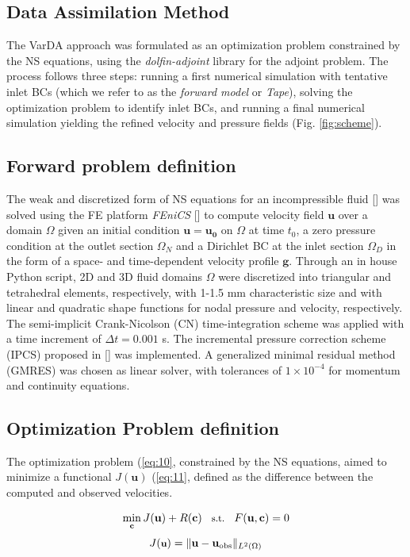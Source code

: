 \subsection*{Data Assimilation Method}
The VarDA approach was formulated as an optimization problem constrained by the NS equations, using the \emph{dolfin-adjoint} library for the adjoint problem. The process follows three steps: running a first numerical simulation with tentative inlet BCs (which we refer to as the \emph{forward model} or \emph{Tape}), solving the optimization problem to identify inlet BCs, and running a final numerical simulation yielding the refined velocity and pressure fields (Fig. \ref{fig:scheme}).

\subsection*{Forward problem definition}
The weak and discretized form of NS equations for an incompressible fluid [\cite{Stokes2009}] was solved using the FE platform \emph{FEniCS} [\cite{Alnaes2015}] to compute velocity field $\textbf{u}$ over a domain $\Omega$ given an initial condition \(\mathbf{u}=\mathbf{u_0}\) on $\Omega$ at time $t_0$, a zero pressure condition at the outlet section $\Omega_N$ and a Dirichlet BC at the inlet section $\Omega_D$ in the form of a space- and time-dependent velocity profile $\textbf{g}$. Through an in house Python script, 2D and 3D fluid domains $\Omega$ were discretized into triangular and tetrahedral elements, respectively, with 1-1.5 mm characteristic size and with linear and quadratic shape functions for nodal pressure and velocity, respectively. The semi-implicit Crank-Nicolson (CN) time-integration scheme was applied with a time increment of $\Delta t = 0.001$ s. The incremental pressure correction scheme (IPCS) proposed in [\cite{Goda1979}] was implemented. A generalized minimal residual method (GMRES) was chosen as linear solver, with tolerances of $1 \times 10^{-4}$ for momentum and continuity equations.

\subsection*{Optimization Problem definition}

The optimization problem (\cref{eq:10}, constrained by the NS equations, aimed to minimize a functional $J(\mathbf{u})$ (\cref{eq:11}, defined as the difference between the computed and observed velocities. 

\begin{equation}
\small
\min_{\mathbf{c}} J(\mathbf{u}) + R(\mathbf{c}) \quad \text{s.t.} \quad F(\mathbf{u}, \mathbf{c}) = 0
\label{eq:10}
\end{equation}
\begin{equation}
\small
    J(\textbf{u}) = \| \mathbf{u} - \mathbf{u}_{\text{obs}} \|_{L^2(\Omega)}
    \label{eq:11}
\end{equation}

